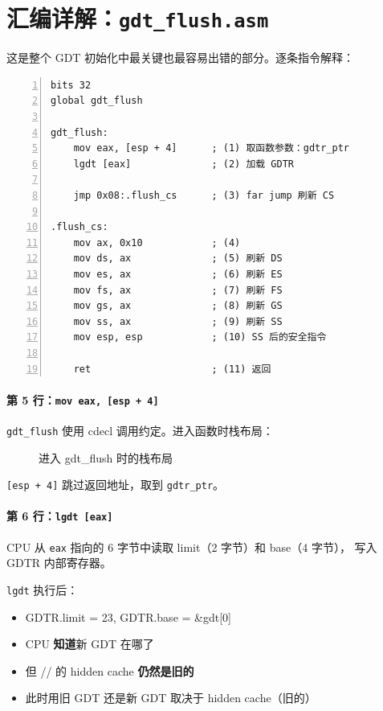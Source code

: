 \section{汇编详解：\texttt{gdt\_flush.asm}}

这是整个 GDT 初始化中最关键也最容易出错的部分。逐条指令解释：

\begin{lstlisting}[style=nasmstyle, numbers=left]
bits 32
global gdt_flush

gdt_flush:
    mov eax, [esp + 4]      ; (1) 取函数参数：gdtr_ptr
    lgdt [eax]              ; (2) 加载 GDTR

    jmp 0x08:.flush_cs      ; (3) far jump 刷新 CS

.flush_cs:
    mov ax, 0x10            ; (4)
    mov ds, ax              ; (5) 刷新 DS
    mov es, ax              ; (6) 刷新 ES
    mov fs, ax              ; (7) 刷新 FS
    mov gs, ax              ; (8) 刷新 GS
    mov ss, ax              ; (9) 刷新 SS
    mov esp, esp            ; (10) SS 后的安全指令

    ret                     ; (11) 返回
\end{lstlisting}

\paragraph{第 5 行：\texttt{mov eax, [esp + 4]}}

\texttt{gdt\_flush} 使用 cdecl 调用约定。进入函数时栈布局：

\begin{figure}[H]
  \centering
  
  \caption{进入 gdt\_flush 时的栈布局}
\end{figure}

\texttt{[esp + 4]} 跳过返回地址，取到 \texttt{gdtr\_ptr}。

\paragraph{第 6 行：\texttt{lgdt [eax]}}

CPU 从 \texttt{eax} 指向的 6 字节中读取 limit（2 字节）和 base（4 字节），
写入 GDTR 内部寄存器。

\begin{cpustate}
\texttt{lgdt} 执行后：
\begin{itemize}
  \item GDTR.limit = 23, GDTR.base = \&gdt[0]
  \item CPU \textbf{知道}新 GDT 在哪了
  \item 但 // 的 hidden cache \textbf{仍然是旧的}
  \item 此时用旧 GDT 还是新 GDT 取决于 hidden cache（旧的）
\end{itemize}
\end{cpustate}


